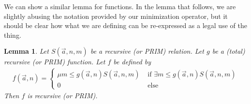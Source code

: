 \documentclass{article}
\theoremstyle{definition}
\theoremstyle{plain}
\theoremstyle{theorem}
\newtheorem{lemma}{Lemma}[section]
\begin{document}
We can show a similar lemma for functions. In the lemma that follows, we are slightly abusing the notation provided by our minimization operator, but it should be clear how what we are defining can be re-expressed as a legal use of the thing.
\begin{lemma}
    Let $S(\vec{a},n,m)$ be a recursive (or PRIM) relation. Let $g$ be a (total) recursive (or PRIM) function. Let $f$ be defined by
    \begin{align}
        f(\vec{a},n) = \begin{cases}
                        \mu m \leq g(\vec{a},n) S(\vec{a},n,m) & \textrm{ if $\exists m \leq g(\vec{a},n)S(\vec{a},n,m)$} \\
                        0 & \textrm{ else}
        \end{cases}
    \end{align}
    Then $f$ is recursive (or PRIM).
\end{lemma}
\end{document}
